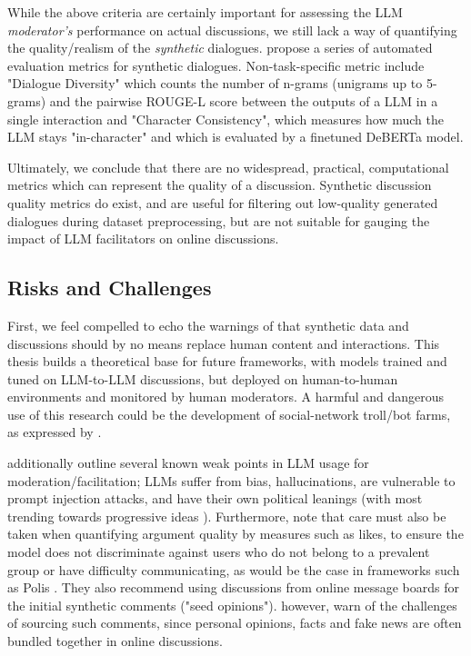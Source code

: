 While the above criteria are certainly important for assessing the LLM \textit{moderator's} performance on actual discussions, we still lack a way of quantifying the quality/realism of the \textit{synthetic} dialogues. \citet{ulmer2024bootstrappingllmbasedtaskorienteddialogue} propose a series of automated evaluation metrics for synthetic dialogues. Non-task-specific metric include "Dialogue Diversity" which counts the number of n-grams (unigrams up to 5-grams) and the pairwise ROUGE-L \cite{lin-2004-rouge} score between the outputs of a LLM in a single interaction and "Character Consistency", which measures how much the LLM stays "in-character" and which is evaluated by a finetuned DeBERTa \cite{he2023debertav3improvingdebertausing} model. 

Ultimately, we conclude that there are no widespread, practical, computational metrics which can represent the quality of a discussion. Synthetic discussion quality metrics do exist, and are useful for filtering out low-quality generated dialogues during dataset preprocessing, but are not suitable for gauging the impact of LLM facilitators on online discussions.


\subsection{Risks and Challenges}
\label{sec:related:challenges}

First, we feel compelled to echo the warnings of \citet{small-polis-llm} that synthetic data and discussions should by no means replace human content and interactions. This thesis builds a theoretical base for future frameworks, with models trained and tuned on LLM-to-LLM discussions, but deployed on human-to-human environments and monitored by human moderators. A harmful and dangerous use of this research could be the development of social-network troll/bot farms, as expressed by \citet{park2022socialsimulacracreatingpopulated}.

\citet{small-polis-llm} additionally outline several known weak points in LLM usage for moderation/facilitation; LLMs suffer from bias, hallucinations, are vulnerable to prompt injection attacks, and have their own political leanings (with most trending towards progressive ideas \cite{Taubenfeld2024SystematicBI}). Furthermore, \citet{vecchi-2021-towards} note that care must also be taken when quantifying argument quality by measures such as likes, to ensure the model does not discriminate against users who do not belong to a prevalent group or have difficulty communicating, as would be the case in frameworks such as Polis \cite{small2021polis}. They also recommend using discussions from online message boards for the initial synthetic comments ("seed opinions"). \citet{vecchi-2021-towards} however, warn of the challenges of sourcing such comments, since personal opinions, facts and fake news are often bundled together in online discussions.

